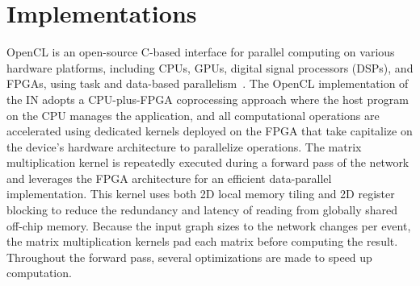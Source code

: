 \documentclass{article}
\begin{document}
\section{Implementations}
\label{sec:impl}

OpenCL is an open-source C-based interface for parallel computing on various hardware platforms, including CPUs, GPUs, digital signal processors (DSPs), and FPGAs, using task and data-based parallelism~\cite{OpenCL}.
The OpenCL implementation of the IN adopts a CPU-plus-FPGA coprocessing approach where the host program on the CPU manages the application, and all computational operations are accelerated using dedicated kernels deployed on the FPGA that take capitalize on the device's hardware architecture to parallelize operations. 
The matrix multiplication kernel is repeatedly executed during a forward pass of the network and leverages the FPGA architecture for an efficient data-parallel implementation. 
This kernel uses both 2D local memory tiling and 2D register blocking to reduce the redundancy and latency of reading from globally shared off-chip memory. %
Because the input graph sizes to the network changes per event, the matrix multiplication kernels pad each matrix before computing the result. Throughout the forward pass, several optimizations are made to speed up computation. 
\end{document}

